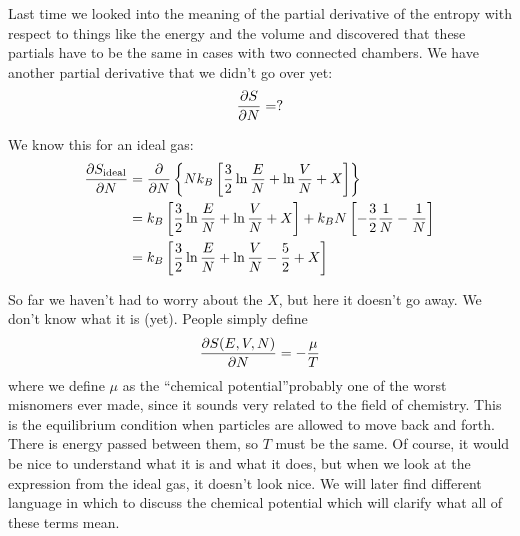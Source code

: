 \documentclass[a4paper,twoside,master.tex]{subfiles}
\begin{document}

Last time we looked into the meaning of the partial derivative of the entropy with respect to things like the energy and the volume and discovered that these partials have to be the same in cases with two connected chambers. We have another partial derivative that we didn't go over yet:
\begin{equation}
    \pdv{S}{N} = ?
\end{equation}

We know this for an ideal gas:
\begin{align}
    \pdv{S_{\text{ideal}}}{N} &= \pdv{N}\left\{ N k_B \left[ \frac{3}{2} \ln{\frac{E}{N}} + \ln{\frac{V}{N}} + X \right] \right\} \\
    &= k_B \left[ \frac{3}{2} \ln{\frac{E}{N}} + \ln{\frac{V}{N}} + X \right] + k_B N \left[ - \frac{3}{2} \frac{1}{N} - \frac{1}{N} \right] \\
    &= k_B \left[ \frac{3}{2} \ln{\frac{E}{N}} + \ln{\frac{V}{N}} - \frac{5}{2} + X \right]
\end{align}

So far we haven't had to worry about the $ X $, but here it doesn't go away. We don't know what it is (yet). People simply define
\begin{equation}
    \pdv{S(E,V,N)}{N} = - \frac{\mu}{T}
\end{equation}
where we define $ \mu $ as the ``chemical potential''\textemdash probably one of the worst misnomers ever made, since it sounds very related to the field of chemistry. This is the equilibrium condition when particles are allowed to move back and forth. There is energy passed between them, so $ T $ must be the same. Of course, it would be nice to understand what it is and what it does, but when we look at the expression from the ideal gas, it doesn't look nice. We will later find different language in which to discuss the chemical potential which will clarify what all of these terms mean.
\end{document}
